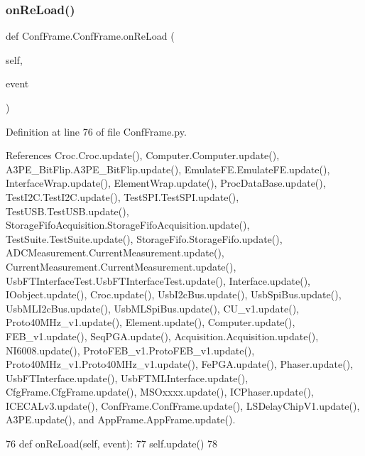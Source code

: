 \subsubsection{\texorpdfstring{on\+Re\+Load()}{onReLoad()}}
{\footnotesize\ttfamily def Conf\+Frame.\+Conf\+Frame.\+on\+Re\+Load (\begin{DoxyParamCaption}\item[{}]{self,  }\item[{}]{event }\end{DoxyParamCaption})}



Definition at line 76 of file Conf\+Frame.\+py.



References Croc.\+Croc.\+update(), Computer.\+Computer.\+update(), A3\+P\+E\+\_\+\+Bit\+Flip.\+A3\+P\+E\+\_\+\+Bit\+Flip.\+update(), Emulate\+F\+E.\+Emulate\+F\+E.\+update(), Interface\+Wrap.\+update(), Element\+Wrap.\+update(), Proc\+Data\+Base.\+update(), Test\+I2\+C.\+Test\+I2\+C.\+update(), Test\+S\+P\+I.\+Test\+S\+P\+I.\+update(), Test\+U\+S\+B.\+Test\+U\+S\+B.\+update(), Storage\+Fifo\+Acquisition.\+Storage\+Fifo\+Acquisition.\+update(), Test\+Suite.\+Test\+Suite.\+update(), Storage\+Fifo.\+Storage\+Fifo.\+update(), A\+D\+C\+Measurement.\+Current\+Measurement.\+update(), Current\+Measurement.\+Current\+Measurement.\+update(), Usb\+F\+T\+Interface\+Test.\+Usb\+F\+T\+Interface\+Test.\+update(), Interface.\+update(), I\+Oobject.\+update(), Croc.\+update(), Usb\+I2c\+Bus.\+update(), Usb\+Spi\+Bus.\+update(), Usb\+M\+L\+I2c\+Bus.\+update(), Usb\+M\+L\+Spi\+Bus.\+update(), C\+U\+\_\+v1.\+update(), Proto40\+M\+Hz\+\_\+v1.\+update(), Element.\+update(), Computer.\+update(), F\+E\+B\+\_\+v1.\+update(), Seq\+P\+G\+A.\+update(), Acquisition.\+Acquisition.\+update(), N\+I6008.\+update(), Proto\+F\+E\+B\+\_\+v1.\+Proto\+F\+E\+B\+\_\+v1.\+update(), Proto40\+M\+Hz\+\_\+v1.\+Proto40\+M\+Hz\+\_\+v1.\+update(), Fe\+P\+G\+A.\+update(), Phaser.\+update(), Usb\+F\+T\+Interface.\+update(), Usb\+F\+T\+M\+L\+Interface.\+update(), Cfg\+Frame.\+Cfg\+Frame.\+update(), M\+S\+Oxxxx.\+update(), I\+C\+Phaser.\+update(), I\+C\+E\+C\+A\+Lv3.\+update(), Conf\+Frame.\+Conf\+Frame.\+update(), L\+S\+Delay\+Chip\+V1.\+update(), A3\+P\+E.\+update(), and App\+Frame.\+App\+Frame.\+update().


\begin{DoxyCode}
76     \textcolor{keyword}{def }onReLoad(self, event):
77         self.update()
78 
\end{DoxyCode}
\mbox{\label{classConfFrame_1_1ConfFrame_a09edd8c77d7a902e321a6cdecc41a769}} 
